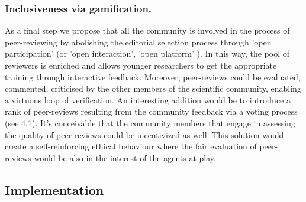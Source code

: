 \documentclass[runningheads]{llncs}
\begin{document}
\subsubsection{Inclusiveness via gamification.} As a final step we propose that all the community is involved in the process of peer-reviewing by abolishing the editorial selection process through 'open participation' (or 'open interaction', 'open platform' \cite{OPR-Ross-Hellauer,RossHellauer-OPR}). In this way, the pool of reviewers is enriched and allows younger researchers to get the appropriate training through interactive feedback. Moreover, peer-reviews could be evaluated, commented, criticised by the other members of the scientific community, enabling a virtuous loop of verification. An interesting addition would be to introduce a rank of peer-reviews resulting from the community feedback via a voting process (see 4.1). It's conceivable that the community members that engage in assessing the quality of peer-reviews could be incentivized as well. This solution would create a self-reinforcing ethical behaviour where the fair evaluation of peer-reviews would be also in the interest of the agents at play.

\subsection{Implementation}
\end{document}
